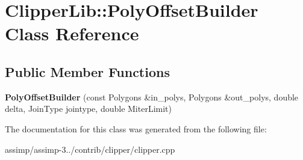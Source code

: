 \hypertarget{class_clipper_lib_1_1_poly_offset_builder}{\section{Clipper\+Lib\+:\+:Poly\+Offset\+Builder Class Reference}
\label{class_clipper_lib_1_1_poly_offset_builder}
}
\subsection*{Public Member Functions}
\begin{DoxyCompactItemize}
\item 
\hypertarget{class_clipper_lib_1_1_poly_offset_builder_adcb5b6ed73f70e49c906d0d2e072644b}{{\bfseries Poly\+Offset\+Builder} (const Polygons \&in\+\_\+polys, Polygons \&out\+\_\+polys, double delta, Join\+Type jointype, double Miter\+Limit)}\label{class_clipper_lib_1_1_poly_offset_builder_adcb5b6ed73f70e49c906d0d2e072644b}

\end{DoxyCompactItemize}


The documentation for this class was generated from the following file\+:\begin{DoxyCompactItemize}
\item 
assimp/assimp-\/3../contrib/clipper/clipper.\+cpp\end{DoxyCompactItemize}
